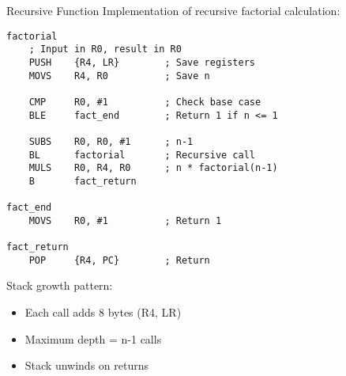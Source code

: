 \begin{example2}{Recursive Function}
Implementation of recursive factorial calculation:
\begin{lstlisting}[language=armasm, style=basesmol]
factorial
    ; Input in R0, result in R0
    PUSH    {R4, LR}        ; Save registers
    MOVS    R4, R0          ; Save n
    
    CMP     R0, #1          ; Check base case
    BLE     fact_end        ; Return 1 if n <= 1
    
    SUBS    R0, R0, #1      ; n-1
    BL      factorial       ; Recursive call
    MULS    R0, R4, R0      ; n * factorial(n-1)
    B       fact_return
    
fact_end
    MOVS    R0, #1          ; Return 1
    
fact_return
    POP     {R4, PC}        ; Return
\end{lstlisting}

Stack growth pattern:
\begin{itemize}
  \item Each call adds 8 bytes (R4, LR)
  \item Maximum depth = n-1 calls
  \item Stack unwinds on returns
\end{itemize}
\end{example2}

